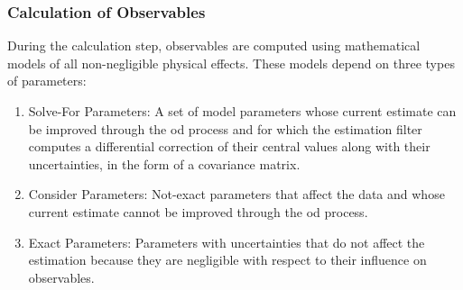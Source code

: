 \documentclass{article}
\begin{document}
                \subsubsection{%
                    \footnotesize{Calculation of Observables}
                }
                    During the calculation step, observables are
                    computed using mathematical models of all
                    non-negligible physical effects. These models
                    depend on three types of parameters:
                    \begin{enumerate}
                        \item {}
                                      {Solve-For Parameters}: 
                              A set of model parameters whose
                              current estimate can be improved
                              through the \gls{od} process and for
                              which the estimation filter computes
                              a differential correction of their
                              central values along with their
                              uncertainties, in the form of a
                              \gls{covariance matrix}.
                        \item {}
                                      {Consider Parameters}:
                              Not-exact parameters that affect
                              the data and whose current estimate
                              cannot be improved through the
                              \gls{od} process.
                        \item {}
                                      {Exact Parameters}:
                              Parameters with uncertainties that do
                              not affect the estimation because they
                              are negligible with respect to their
                              influence on observables.
                    \end{enumerate}
\end{document}
